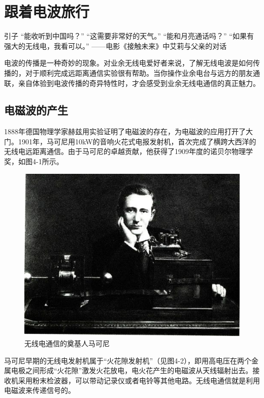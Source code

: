 \documentclass[12pt,UTF8]{ctexbook}
\begin{document}
\chapter{跟着电波旅行}

引子
“能收听到中国吗？”
“这需要非常好的天气。”
“能和月亮通话吗？”
“如果有强大的无线电，我看可以。”
——电影《接触未来》中艾莉与父亲的对话

电波的传播是一种奇妙的现象。对业余无线电爱好者来说，了解无线电波是如何传播的，对于顺利完成远距离通信实验很有帮助。当你操作业余电台与远方的朋友通联，亲自体验到电波传播的奇异特性时，才会感受到业余无线电通信的真正魅力。

\section{电磁波的产生}

1888年德国物理学家赫兹用实验证明了电磁波的存在，为电磁波的应用打开了大门。1901年，马可尼用10kW的音响火花式电报发射机，首次完成了横跨大西洋的无线电远距离通信。由于马可尼的卓越贡献，他获得了1909年度的诺贝尔物理学奖，如图4-1所示。

\begin{figure}[htbp]
	\centering
	\includegraphics[width=0.7\linewidth]{44}
	\caption{无线电通信的奠基人马可尼}
	\label{fig:1}
\end{figure}

马可尼早期的无线电发射机属于“火花隙发射机”（见图4-2），即用高电压在两个金属电极之间形成“火花隙”激发火花放电，电火花产生的电磁波从天线辐射出去。接收机采用粉末检波器，可以带动记录仪或者电铃等其他电路。无线电通信就是利用电磁波来传递信号的。
\end{document}

